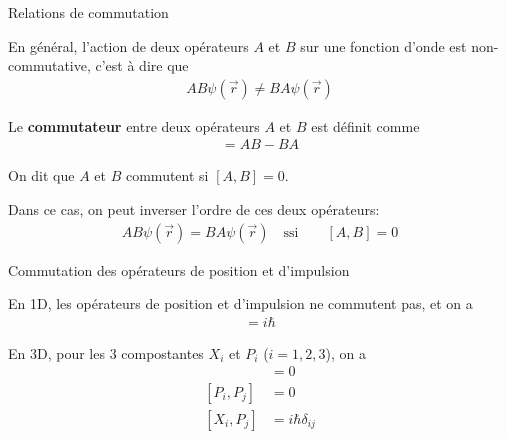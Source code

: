 \documentclass[xcolor=svgnames,t,aspectratio=169,handout]{uqtrcours}
\begin{document}
\begin{frame}{Relations de commutation}

En général, l'action de deux opérateurs $A$ et $B$
  sur une fonction d'onde est non-commutative, c'est à dire que
\begin{align}
  A B \psi(\vec r) \neq B A \psi(\vec r)
\end{align}

Le \textbf{commutateur} entre deux opérateurs $A$ et $B$
  est définit comme
\begin{align}
  [A,B] = AB - BA
\end{align}

On dit que $A$ et $B$ commutent si $[A,B]=0$.

\medskip

Dans ce cas, on peut inverser l'ordre de ces deux opérateurs:
\begin{align}
  A B \psi(\vec r) = B A \psi(\vec r)
  \quad \text{ssi} \qquad
  [A,B]=0
\end{align}



%
%

\end{frame}



\begin{frame}{Commutation des opérateurs de position et d'impulsion}

En 1D, les opérateurs de position et d'impulsion ne commutent pas,
  et on a
\begin{align}
  [X, P] = i \hbar
\end{align}

\medskip

En 3D, pour les 3 compostantes $X_i$ et $P_i$  ($i=1,2,3$), on a
\begin{align}
  [X_i, X_j] &= 0\\
  [P_i, P_j] &= 0\\
  [X_i, P_j] &= i\hbar \delta_{ij}
\end{align}

\end{frame}
\end{document}
